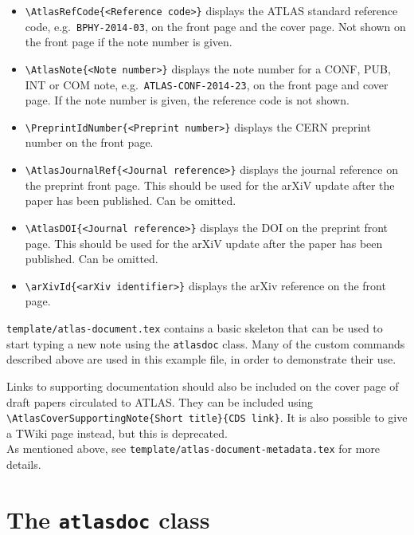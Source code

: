 \documentclass[atlasstyle,UKenglish]{latex/atlasdoc}
\begin{document}
\begin{itemize}
  \item {\verb|\AtlasRefCode{<Reference code>}|} displays the ATLAS
    standard reference code, e.g.\ \texttt{BPHY-2014-03}, on the front page and
    the cover page. Not shown on the front page if the note number is given.

  \item {\verb|\AtlasNote{<Note number>}|} displays the note number
    for a CONF, PUB, INT or COM note, e.g.\ \texttt{ATLAS-CONF-2014-23},
    on the front page and cover page.
    If the note number is given, the reference code is not shown.

  \item {\verb|\PreprintIdNumber{<Preprint number>}|} displays the CERN
    preprint number on the front page.

  \item {\verb|\AtlasJournalRef{<Journal reference>}|} displays the journal reference
    on the preprint front page.
    This should be used for the arXiV update after the paper has been published.
    Can be omitted.

  \item {\verb|\AtlasDOI{<Journal reference>}|} displays the DOI
    on the preprint front page.
    This should be used for the arXiV update after the paper has been published.
    Can be omitted.

  \item {\verb|\arXivId{<arXiv identifier>}|} displays the arXiv reference
    on the front page.

\end{itemize}
%
\texttt{template/atlas-document.tex} contains a basic skeleton that can be
used to start typing a new note using the \texttt{atlasdoc} class. Many of
the custom commands described above are used in this example file, in
order to demonstrate their use.

Links to supporting documentation should also be included on the cover page of draft papers circulated to ATLAS.
They can be included using
\verb|\AtlasCoverSupportingNote{Short title}{CDS link}|.
It is also possible to give a TWiki page instead, but this is deprecated.\\
As mentioned above, see \texttt{template/atlas-document-metadata.tex} for more details.

\section{The \texttt{atlasdoc} class}
\label{app:atlasdoc}
\end{document}
